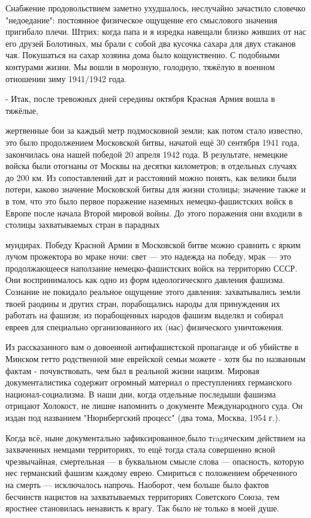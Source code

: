 
\label{242-1}
Снабжение продовольствием заметно ухудшалось, неслучайно зачастило словечко "недоедание": постоянное физическое ощущение его смыслового значения пригибало плечи. Штрих: когда папа и я изредка навещали близко живших от нас его друзей Болотиных, мы брали с собой два кусочка сахара для двух стаканов чая. Покушаться на сахар хозяина дома было кощунственно. С подобными контурами жизни. Мы вошли в морозную, голодную, тяжёлую в военном отношении зиму 1941/1942 года.

- Итак, после тревожных дней середины октября Красная Армия вошла в тяжёлые,

\label{243-1}
жертвенные бои за каждый метр подмосковной земли; как потом стало известно, это было продолжением Московской битвы, начатой ещё 30 сентября 1941 года, закончилась она нашей победой 20 апреля 1942 года. В результате, немецкие войска были отогнаны от Москвы на десятки километров; в отдельных случаях до 200 км. Из сопоставлений дат и расстояний можно понять, как велики были потери, каково значение Московской битвы для жизни столицы; значение также и в том, что это было первое поражение наземных немецко-фашистских войск в Европе после начала Второй мировой войны. До этого поражения они входили в столицы захватываемых стран в парадных

\label{244-1}
мундирах. Победу Красной Армии в Московской битве можно сравнить с ярким лучом прожектора во мраке ночи: свет — это надежда на победу, мрак — это продолжающееся наползание немецко-фашистских войск на территорию СССР. Они воспринималось как одно из форм идеологического давления фашизма. Сознание не покидало реальное ощущение этого давления: захватывались земли твоей раодины и других стран, порабощались народы для принуждения их работать на фашизм; из порабощенных народов фашизм выделял и собирал евреев для специально организованного их (нас) физического уничтожения.

\label{245-1}
Из рассказанного вам о довоенной антифашистской пропаганде и об убийстве в Минском гетто родственной мне еврейской семьи можете - хотя бы по названным фактам - почувствовать, чем был в реальной жизни нацизм. Мировая документалистика содержит огромный материал о преступлениях германского национал-социализма.
В наши дни, когда отдельные последыши фашизма отрицают Холокост, не лишне напомнить о документе Международного суда. Он издан под названием "Нюрнбергский процесс" (два тома, Москва, 1954 г.).

\label{246-1}
Когда всё, ныне документально зафиксированное,было тragическим действием на захваченных немцами территориях, то ещё тогда стала совершенно ясной чрезвычайная, смертельная — в буквальном смысле слова — опасность, которую нес германский фашизм каждому еврею.
Смириться с положением обреченного на смерть — исключалось напрочь. Наоборот, чем больше было фактов бесчинств нацистов на захватываемых территориях Советского Союза, тем яростнее становилась ненависть к врагу. Так было не только в моей душе.

